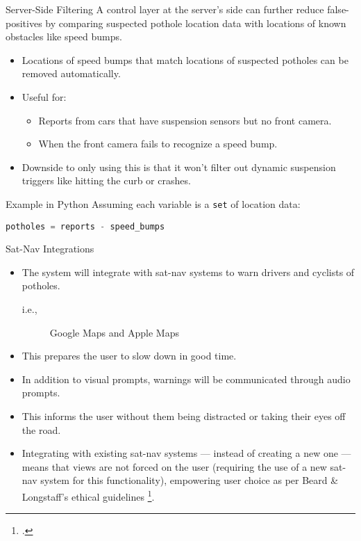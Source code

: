 \documentclass{beamer}
\begin{document}
\begin{frame}{Server-Side Filtering}
    A control layer at the server's side can further reduce false-positives by comparing suspected pothole location data with locations of known obstacles like speed bumps.

    \begin{itemize}
        \item Locations of speed bumps that match locations of suspected potholes can be removed automatically.
        \item Useful for:
        \begin{itemize}
            \item Reports from cars that have suspension sensors but no front camera.
            \item When the front camera fails to recognize a speed bump.
        \end{itemize}
        \item Downside to \alert{only} using this is that it won't filter out dynamic suspension triggers like hitting the curb or crashes.
    \end{itemize}
    
    \begin{exampleblock}{Example in Python}
        Assuming each variable is a \lstinline|set| of location data:

        \lstinline[language=Python]|potholes = reports - speed_bumps|
    \end{exampleblock}
\end{frame}

\begin{frame}{Sat-Nav Integrations}    
    \begin{itemize}
        \item The system will integrate with sat-nav systems to warn drivers and cyclists of potholes.
        \begin{description}
            \item[i.e.,] Google Maps and Apple Maps 
        \end{description}
        \item This prepares the user to slow down in good time.
        \item In addition to visual prompts, warnings will be communicated through audio prompts.
        \item This informs the user without them being distracted or taking their eyes off the road.
        \item Integrating with existing sat-nav systems --- instead of creating a new one --- means that views are not forced on the user (requiring the use of a new sat-nav system for this functionality), empowering user choice as per Beard \& Longstaff's ethical guidelines \footcite{principles-for-good-tech}.
    \end{itemize}
\end{frame}
\end{document}
